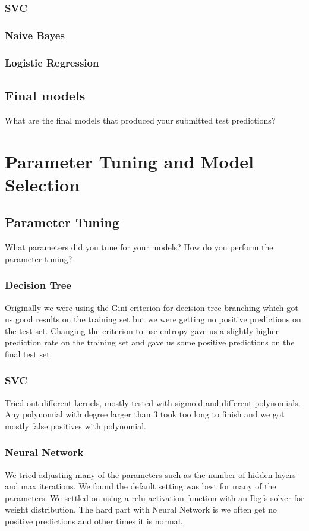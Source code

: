 \documentclass[11pt,a4paper]{article}
\begin{document}
		\subsubsection{SVC}

		\subsubsection{Naive Bayes}

		\subsubsection{Logistic Regression}

	\subsection{Final models}
		What are the final models that produced your submitted test predictions?

\section{Parameter Tuning and Model Selection }
	\subsection{Parameter Tuning}
		What parameters did you tune for your models? How do you perform the parameter tuning?

		\subsubsection{Decision Tree}
			Originally we were using the Gini criterion for decision tree branching which got us good results on the training set but we were getting no positive predictions on the test set.
			Changing the criterion to use entropy gave us a slightly higher prediction rate on the training set and gave us some positive predictions on the final test set.

		\subsubsection{SVC}
			Tried out different kernels, mostly tested with sigmoid and different polynomials.
			Any polynomial with degree larger than 3 took too long to finish and we got mostly false positives with polynomial.

		\subsubsection{Neural Network}
			We tried adjusting many of the parameters such as the number of hidden layers and max iterations.
			We found the default setting was best for many of the parameters.
			We settled on using a relu activation function with an Ibgfs solver for weight distribution.
			The hard part with Neural Network is we often get no positive predictions and other times it is normal.
\end{document}
